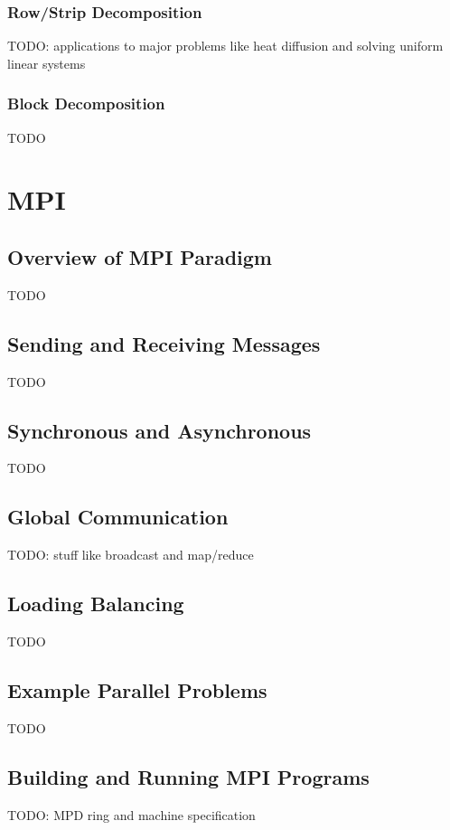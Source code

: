 \documentclass{article}
\begin{document}
\subsubsection{Row/Strip Decomposition}

TODO: applications to major problems like heat diffusion and solving uniform linear systems

\subsubsection{Block Decomposition}

TODO

\section{MPI}

\subsection{Overview of MPI Paradigm}

TODO

\subsection{Sending and Receiving Messages}

TODO

\subsection{Synchronous and Asynchronous}

TODO

\subsection{Global Communication}

TODO: stuff like broadcast and map/reduce

\subsection{Loading Balancing}

TODO

\subsection{Example Parallel Problems}

TODO

\subsection{Building and Running MPI Programs}

TODO: MPD ring and machine specification



\end{document}
